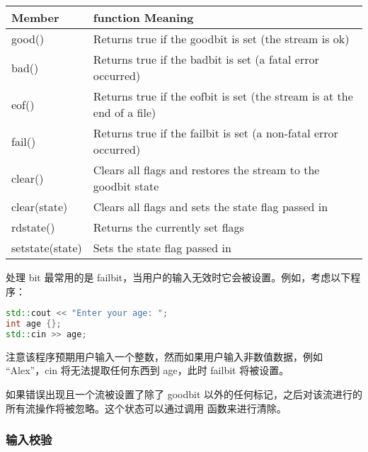 \documentclass[../../LearnCpp.tex]{subfiles}
\begin{document}
\begin{center}
  \begin{tiny}
    \begin{tabularx}{ 1\textwidth}{
        | >{\raggedright\arraybackslash}X
        | >{\raggedright\arraybackslash}X |
      }
      \hline
      Member          & function	Meaning                                                       \\
      \hline
      good()          & Returns true if the goodbit is set (the stream is ok)                  \\
      bad()           & Returns true if the badbit is set (a fatal error occurred)             \\
      eof()           & Returns true if the eofbit is set (the stream is at the end of a file) \\
      fail()          & Returns true if the failbit is set (a non-fatal error occurred)        \\
      clear()         & Clears all flags and restores the stream to the goodbit state          \\
      clear(state)    & Clears all flags and sets the state flag passed in                     \\
      rdstate()       & Returns the currently set flags                                        \\
      setstate(state) & Sets the state flag passed in                                          \\
      \hline
    \end{tabularx}
  \end{tiny}
\end{center}

处理 bit 最常用的是 failbit，当用户的输入无效时它会被设置。例如，考虑以下程序：

\begin{lstlisting}[language=C++]
std::cout << "Enter your age: ";
int age {};
std::cin >> age;
\end{lstlisting}

注意该程序预期用户输入一个整数，然而如果用户输入非数值数据，例如 “Alex”，cin 将无法提取任何东西到 age，此时 failbit 将被设置。

如果错误出现且一个流被设置了除了 goodbit 以外的任何标记，之后对该流进行的所有流操作将被忽略。这个状态可以通过调用  函数来进行清除。

\subsubsection*{输入校验}
\end{document}
